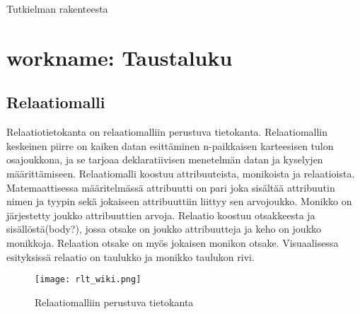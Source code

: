 \documentclass[finnish]{tktltiki2}
\theoremstyle{definition}
\theoremstyle{remark}
\begin{document}
Tutkielman rakenteesta

%
%



\section{workname: Taustaluku}
\subsection{Relaatiomalli}

Relaatiotietokanta on relaatiomalliin perustuva tietokanta. Relaatiomallin keskeinen piirre on kaiken datan esittäminen n-paikkaisen karteesisen tulon osajoukkona, ja se tarjoaa deklaratiivisen menetelmän datan ja kyselyjen määrittämiseen. Relaatiomalli koostuu attribuuteista, monikoista ja relaatioista. Matemaattisessa määritelmässä attribuutti on pari joka sisältää attribuutin nimen ja tyypin sekä jokaiseen attribuuttiin liittyy sen arvojoukko. Monikko on järjestetty joukko attribuuttien arvoja. Relaatio koostuu otsakkeesta ja sisällöstä(body?), jossa otsake on joukko attribuutteja ja keho on joukko monikkoja. Relaation otsake on myös jokaisen monikon otsake. Visuaalisessa esityksissä relaatio on taulukko ja monikko taulukon rivi. 

\begin{figure}[h!]
  \caption{Relaatiomalliin perustuva tietokanta}
  \centering
    \texttt{[image: rlt\_wiki.png]}
\end{figure}
\end{document}
